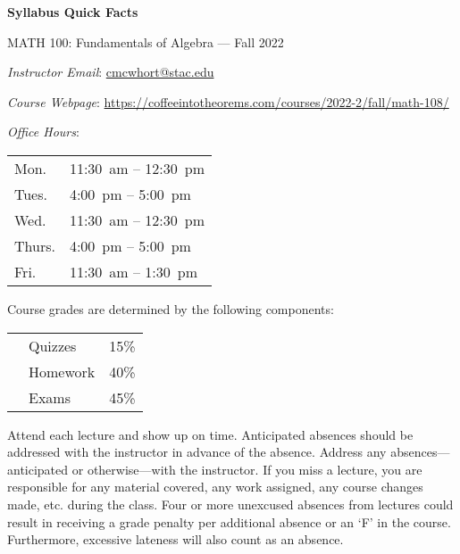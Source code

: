 \documentclass[11pt,letterpaper]{article}
\begin{document}
\begin{center} 
\bfseries
\color{stacred}
\LARGE Syllabus Quick Facts \par\vspace{0.2\baselineskip}
\Large MATH 100: Fundamentals of Algebra --- Fall 2022 
\end{center} \pspace


\hspace{0.53cm} {\itshape Instructor Email}: \href{mailto:cmcwhort@stac.edu}{cmcwhort@stac.edu} \par
\hspace{0.53cm} {\itshape Course Webpage}: \href{https://coffeeintotheorems.com/courses/2022-2/fall/math-108/}{https://coffeeintotheorems.com/courses/2022-2/fall/math-108/} \par
\hspace{0.53cm} {\itshape Office Hours}: 	\par \vspace{-0.3cm}
	\begin{table}[!ht]
	\centering
	\begin{tabular}{l || l}
	Mon. & 11:30~am -- 12:30~pm \\
	Tues. & 4:00~pm -- 5:00~pm \\
	Wed. & 11:30~am -- 12:30~pm \\
	Thurs. & 4:00~pm -- 5:00~pm \\
	Fri. & 11:30~am -- 1:30~pm
	\end{tabular}
	\end{table}


Course grades are determined by the following components: \par \vspace{-0.3cm}
	\begin{table}[!ht]
        \begin{tabular}{clr}
	& Quizzes & 15\% \\
	& Homework & 40\% \\
	& Exams & 45\%
        \end{tabular} 
        \end{table}


Attend each lecture and show up on time. Anticipated absences should be addressed with the instructor in advance of the absence. Address any absences---anticipated or otherwise---with the instructor. If you miss a lecture, you are responsible for any material covered, any work assigned, any course changes made, etc. during the class. Four or more unexcused absences from lectures could result in receiving a grade penalty per additional absence or an `F' in the course. Furthermore, excessive lateness will also count as an absence. \pspace
\end{document}
